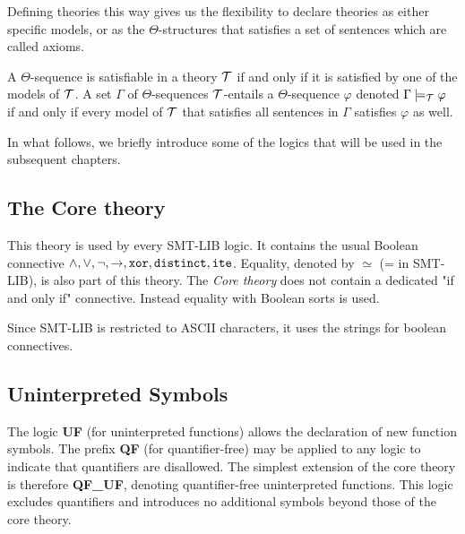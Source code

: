 Defining theories this way gives us the flexibility to declare theories as either specific models, or as the $\Theta$-structures that satisfies a set of sentences which are called axioms.

\begin{definition}
A $\Theta$-sequence is satisfiable in a theory $\cal{T}$ if and only if it is satisfied by one of the models
of $\cal{T}$. A set $\Gamma$ of $\Theta$-sequences $\cal{T}$-entails a $\Theta$-sequence $\varphi$ denoted
$\Gamma \models_{\cal{T}} \varphi$ if and only if every model of $\cal{T}$ that satisfies all sentences in $\Gamma$ satisfies $\varphi$ as well.
\end{definition}

In what follows, we briefly introduce some of the logics that will be used in the subsequent chapters.

\subsection{The Core theory}

This theory is used by every SMT-LIB logic. It contains the usual Boolean connective $\land, \lor, \neg, \to, \kw{xor}, \kw{distinct}, \kw{ite}$.
Equality, denoted by $\simeq$ (= in SMT-LIB), is also part of this theory.
The \emph{Core theory} does not contain a dedicated "if and only if" connective.
Instead equality with Boolean sorts is used.


\begin{remark}
Since SMT-LIB is restricted to ASCII characters, it uses the strings  for boolean  connectives. 
\end{remark}

\subsection{Uninterpreted Symbols}

The logic \textbf{UF} (for uninterpreted functions) allows the declaration of new function symbols.
The prefix \textbf{QF} (for quantifier-free) may be applied to any logic to indicate that quantifiers are disallowed.
The simplest extension of the core theory is therefore \textbf{QF\_UF}, denoting quantifier-free uninterpreted functions.
This logic excludes quantifiers and introduces no additional symbols beyond those of the core theory.

